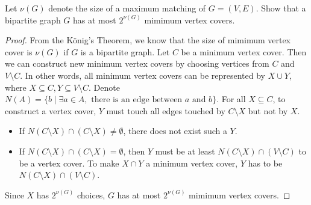 



    \maketitle
    \begin{thm}{}{}
        Let $\nu(G)$ denote the size of a maximum matching of $G=(V,E)$.
        Show that a bipartite graph $G$ has at most $2^{\nu(G)}$ mimimum vertex covers.
    \end{thm}
    \begin{proof}
        From the K\"{o}nig's Theorem, we know that the size of mimimum vertex cover is $\nu(G)$ if $G$ is a bipartite graph.
        Let $C$ be a minimum vertex cover.
        Then we can construct new minimum vertex covers by choosing vertices from $C$ and $V\setminus C$.
        In other words, all minimum vertex covers can be represented by $X\cup Y$, where $X\subseteq C, Y \subseteq V\setminus C$.
        Denote $N(A)=\{b \mid \exists a\in A, \text{ there is an edge between } a \text{ and } b \}$.
        For all $X\subseteq C$, to construct a vertex cover, $Y$ must touch all edges touched by $C\setminus X$ but not by $X$.
        \begin{itemize}
            \item If $N(C\setminus X)\cap (C\setminus X)\ne \emptyset$, there does not exist such a $Y$.
            \item  If $N(C\setminus X)\cap (C\setminus X)= \emptyset$, then $Y$ must be at least $N(C\setminus X) \cap (V\setminus C)$ to be a vertex cover.
            To make $X\cap Y$ a minimum vertex cover, $Y$ has to be $N(C\setminus X) \cap (V\setminus C)$.
        \end{itemize}

        Since $X$ has $2^{\nu(G)}$ choices, $G$ has at most $2^{\nu(G)}$ mimimum vertex covers.
    \end{proof}

